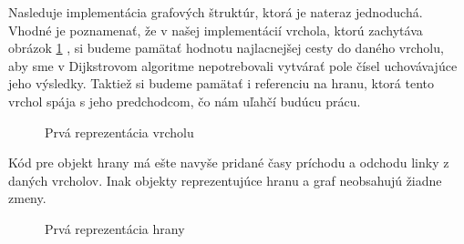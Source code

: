 Nasleduje implementácia grafových štruktúr, ktorá je nateraz jednoduchá. Vhodné je poznamenať, že v našej implementácií vrchola, ktorú zachytáva obrázok \ref{1_Vertex} , si budeme pamätať hodnotu najlacnejšej cesty do daného vrcholu, aby sme v Dijkstrovom algoritme nepotrebovali vytvárať pole čísel uchovávajúce jeho výsledky. Taktiež si budeme pamätať i referenciu na hranu, ktorá tento vrchol spája s jeho predchodcom, čo nám uľahčí budúcu prácu.\newline

\begin{figure}[H]
  \caption{Prvá reprezentácia vrcholu}
  \label{1_Vertex}
\end{figure}

Kód pre objekt hrany má ešte navyše pridané časy príchodu a odchodu linky z daných vrcholov. Inak objekty reprezentujúce hranu a graf neobsahujú žiadne zmeny.\newline

\begin{figure}[H]
  \caption{Prvá reprezentácia hrany}
  \label{1_Edge}
\end{figure}

